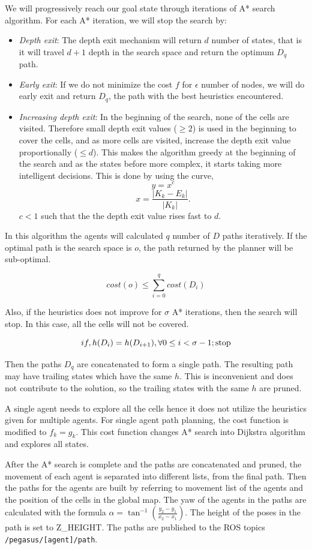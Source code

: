 We will progressively reach our goal state through iterations of A* search algorithm. For each A* iteration, we will stop the search by:
\begin{itemize}
	\item \textit{Depth exit}: The depth exit mechanism will return $d$ number of states, that is it will travel $d+1$ depth in the search space and return the optimum $D_q$ path. 
	\item \textit{Early exit}: If we do not minimize the cost $f$ for $\epsilon$ number of nodes, we will do early exit and return $D_q$, the path with the best heuristics encountered.
	\item \textit{Increasing depth exit}: In the beginning of the search, none of the cells are visited. Therefore small depth exit values ($\geq 2$) is used in the beginning to cover the cells, and as more cells are visited, increase the depth exit value proportionally ($\le d$). This makes the algorithm greedy at the beginning of the search and as the states before more complex, it starts taking more intelligent decisions. This is done by using the curve,
	$$y=x^c$$
	$$x = \frac{|K_k - E_k|}{|K_k|}.$$ $c < 1$ such that the the depth exit value rises fast to $d$.
\end{itemize}

In this algorithm the agents will calculated $q$ number of $D$ paths iteratively. If the optimal path is the search space is $o$, the path returned by the planner will be sub-optimal. 

$$cost(o) \le \sum\limits_{i=0}^q cost(D_i)$$

Also, if the heuristics does not improve for $\sigma$ A* iterations, then the search will stop. In this case, all the cells will not be covered.

$$ if, h(D_i) = h(D_{i+1}), \forall \space 0 \le i < \sigma - 1; \text{stop}$$

Then the paths $D_q$ are concatenated to form a single path. The resulting path may have trailing states which have the same $h$. This is inconvenient  and does not contribute to the solution, so the trailing states with the same $h$ are pruned.

A single agent needs to explore all the cells hence it does not utilize the heuristics given for multiple agents. For single agent path planning, the cost function is modified to $f_k = g_k$. This cost function changes A* search into Dijkstra algorithm and explores all states.

After the A* search is complete and the paths are concatenated and pruned, the movement of each agent is separated into different lists, from the final path. Then the paths for the agents are built by referring to movement list of the agents and the position of the cells in the global map. The yaw of the agents in the paths are calculated with the formula $ \alpha = \tan^{-1} \left( \frac{y_2-y_1}{x_2-x_1} \right)$. The height of the poses in the path is set to Z\_HEIGHT. The paths are published to the ROS topics \texttt{/pegasus/[agent]/path}.


